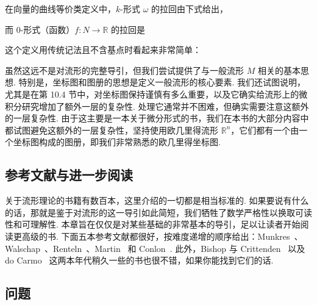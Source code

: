在向量的曲线等价类定义中，$k$-形式 $\omega$ 的拉回由下式给出，
\begin{center}
\end{center}
而 0-形式（函数）$f:N\to\mathbb{R}$ 的拉回是
\begin{center}
\end{center}
这个定义用传统记法且不含基点时看起来非常简单：
\begin{center}
\end{center}

虽然这远不是对流形的完整导引，但我们尝试提供了与一般流形 $M$ 相关的基本思想. 特别是，坐标图和图册的思想是定义一般流形的核心要素. 我们还试图说明，尤其是在第 10.4 节中，对坐标图保持谨慎有多么重要，以及它确实给流形上的微积分研究增加了额外一层的复杂性. 处理它通常并不困难，但确实需要注意这额外的一层复杂性. 由于这主要是一本关于微分形式的书，我们在本书的大部分内容中都试图避免这额外的一层复杂性，坚持使用欧几里得流形 $\mathbb{R}^n$，它们都有一个由一个坐标图构成的图册，即我们非常熟悉的欧几里得坐标图.

\subsection{参考文献与进一步阅读}

关于流形理论的书籍有数百本，这里介绍的一切都是相当标准的. 如果要说有什么的话，那就是鉴于对流形的这一导引如此简短，我们牺牲了数学严格性以换取可读性和可理解性. 本章旨在仅仅是对某些基础的非常基本的导引，足以让读者开始阅读更高级的书. 下面五本参考文献都很好，按难度递增的顺序给出：Munkres~\cite{ref35}、Walschap~\cite{ref47}、Renteln~\cite{ref37}、Martin~\cite{ref33} 和 Conlon~\cite{ref10}. 此外，Bishop 与 Crittenden~\cite{ref05} 以及 do Carmo~\cite{ref14} 这两本年代稍久一些的书也很不错，如果你能找到它们的话.

\subsection{问题}

